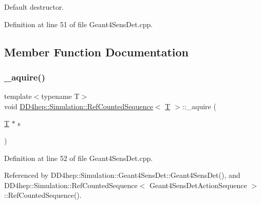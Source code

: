 Default destructor. 



Definition at line 51 of file Geant4\+Sens\+Det.\+cpp.



\subsection{Member Function Documentation}
\hypertarget{class_d_d4hep_1_1_simulation_1_1_ref_counted_sequence_a186785a2a36bfb4dd0468978f4883328}{}\label{class_d_d4hep_1_1_simulation_1_1_ref_counted_sequence_a186785a2a36bfb4dd0468978f4883328} 
\subsubsection{\texorpdfstring{\+\_\+aquire()}{\_aquire()}}
{\footnotesize\ttfamily template$<$typename T$>$ \\
void \hyperlink{class_d_d4hep_1_1_simulation_1_1_ref_counted_sequence}{D\+D4hep\+::\+Simulation\+::\+Ref\+Counted\+Sequence}$<$ \hyperlink{class_t}{T} $>$\+::\+\_\+aquire (\begin{DoxyParamCaption}\item[{\hyperlink{class_t}{T} $\ast$}]{s }\end{DoxyParamCaption})\hspace{0.3cm}{\ttfamily [inline]}}



Definition at line 52 of file Geant4\+Sens\+Det.\+cpp.



Referenced by D\+D4hep\+::\+Simulation\+::\+Geant4\+Sens\+Det\+::\+Geant4\+Sens\+Det(), and D\+D4hep\+::\+Simulation\+::\+Ref\+Counted\+Sequence$<$ Geant4\+Sens\+Det\+Action\+Sequence $>$\+::\+Ref\+Counted\+Sequence().

\hypertarget{class_d_d4hep_1_1_simulation_1_1_ref_counted_sequence_a81c7e6e88d05887495b28cded6899da9}{}\label{class_d_d4hep_1_1_simulation_1_1_ref_counted_sequence_a81c7e6e88d05887495b28cded6899da9} 
